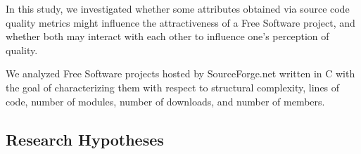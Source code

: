 \documentclass[conference]{IEEEtran}
\newcommand{\TODO}[1]{{\color{red}\textbf{\uwave{#1}}}}
\begin{document}

In this study, we investigated whether some attributes obtained via source code quality metrics might influence the attractiveness of a Free
Software project, and whether both may interact with each other to influence one's perception of quality.

%
We analyzed Free Software projects hosted by SourceForge.net  written in C 
with the goal of characterizing them with respect to 
structural complexity, lines of code, number of modules, number of downloads, and number of members.
%




\subsection{Research Hypotheses} 
\label{hypotheses}

\end{document}
